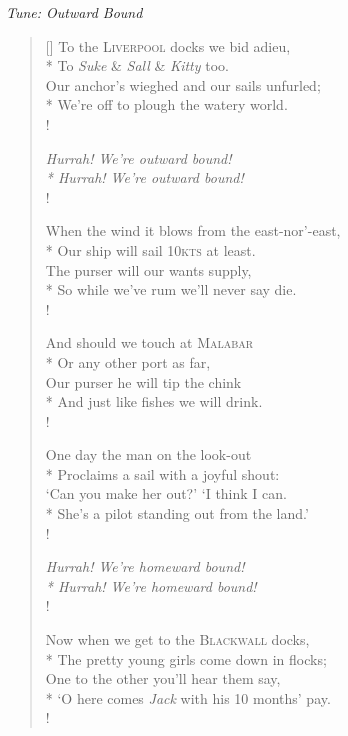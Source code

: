 \begin{center}
\textit{Tune: Outward Bound}
\end{center}

\begin{verse}[\versewidth]
To the \textsc{Liverpool} docks we bid adieu,\\*
To \textit{Suke} \& \textit{Sall} \& \textit{Kitty} too.\\
Our anchor's wieghed and our sails unfurled;\\*
We're off to plough the watery world.\\!

{\itshape 
Hurrah! We're outward bound!\\*
Hurrah! We're outward bound!}\\!

When the wind it blows from the east-nor'-east,\\*
Our ship will sail 10\textsc{kts} at least.\\
The purser will our wants supply,\\*
So while we've rum we'll never say die.\\!

And should we touch at \textsc{Malabar}\\*
Or any other port as far,\\
Our purser he will tip the chink\\*
And just like fishes we will drink.\\!

One day the man on the look-out\\*
Proclaims a sail with a joyful shout:\\
`Can you make her out?' `I think I can.\\*
She's a pilot standing out from the land.'\\!

{\itshape 
Hurrah! We're homeward bound!\\*
Hurrah! We're homeward bound!}\\!

Now when we get to the \textsc{Blackwall} docks,\\*
The pretty young girls come down in flocks;\\
One to the other you'll hear them say,\\*
`O here comes \textit{Jack} with his 10 months' pay.\\!


\end{verse}

